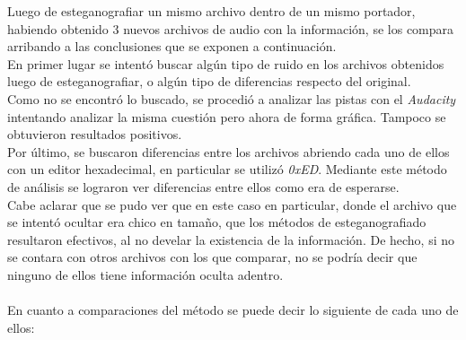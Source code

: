 \documentclass{article}
\begin{document}
\noindent Luego de esteganografiar un mismo archivo dentro de un mismo portador, habiendo obtenido 3 nuevos archivos de audio con la información, se los compara arribando a las conclusiones que se exponen a continuación.\\
En primer lugar se intentó buscar algún tipo de ruido en los archivos obtenidos luego de esteganografiar, o algún tipo de diferencias respecto del original.\\
Como no se encontró lo buscado, se procedió a analizar las pistas con el \textit{Audacity} intentando analizar la misma cuestión pero ahora de forma gráfica. Tampoco se obtuvieron resultados positivos.\\
Por último, se buscaron diferencias entre los archivos abriendo cada uno de ellos con un editor hexadecimal, en particular se utilizó \textit{0xED}. Mediante este método de análisis se lograron ver diferencias entre ellos como era de esperarse.\\
Cabe aclarar que se pudo ver que en este caso en particular, donde el archivo que se intentó ocultar era chico en tamaño, que los métodos de esteganografiado resultaron efectivos, al no develar la existencia de la información. De hecho, si no se contara con otros archivos con los que comparar, no se podría decir que ninguno de ellos tiene información oculta adentro.\\
\\
\noindent En cuanto a comparaciones del método se puede decir lo siguiente de cada uno de ellos:\\
\end{document}

